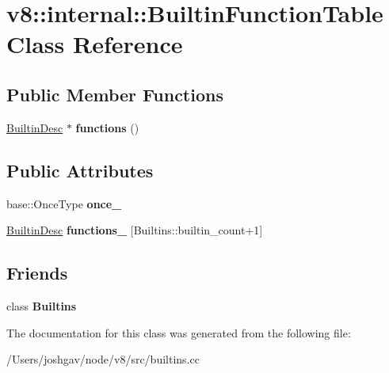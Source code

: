 \hypertarget{classv8_1_1internal_1_1_builtin_function_table}{}\section{v8\+:\+:internal\+:\+:Builtin\+Function\+Table Class Reference}
\label{classv8_1_1internal_1_1_builtin_function_table}
\subsection*{Public Member Functions}
\begin{DoxyCompactItemize}
\item 
\hyperlink{structv8_1_1internal_1_1_builtin_desc}{Builtin\+Desc} $\ast$ {\bfseries functions} ()\hypertarget{classv8_1_1internal_1_1_builtin_function_table_a10ec52c395d6924f6474b076298106b4}{}\label{classv8_1_1internal_1_1_builtin_function_table_a10ec52c395d6924f6474b076298106b4}

\end{DoxyCompactItemize}
\subsection*{Public Attributes}
\begin{DoxyCompactItemize}
\item 
base\+::\+Once\+Type {\bfseries once\+\_\+}\hypertarget{classv8_1_1internal_1_1_builtin_function_table_a1a9fe672f4e4d2e9ad88f62c63d8d461}{}\label{classv8_1_1internal_1_1_builtin_function_table_a1a9fe672f4e4d2e9ad88f62c63d8d461}

\item 
\hyperlink{structv8_1_1internal_1_1_builtin_desc}{Builtin\+Desc} {\bfseries functions\+\_\+} \mbox{[}Builtins\+::builtin\+\_\+count+1\mbox{]}\hypertarget{classv8_1_1internal_1_1_builtin_function_table_a362e4df9c4683bf2e2575590d29f7bb8}{}\label{classv8_1_1internal_1_1_builtin_function_table_a362e4df9c4683bf2e2575590d29f7bb8}

\end{DoxyCompactItemize}
\subsection*{Friends}
\begin{DoxyCompactItemize}
\item 
class {\bfseries Builtins}\hypertarget{classv8_1_1internal_1_1_builtin_function_table_afb9273054bbf7171a46b35cebb4d4b34}{}\label{classv8_1_1internal_1_1_builtin_function_table_afb9273054bbf7171a46b35cebb4d4b34}

\end{DoxyCompactItemize}


The documentation for this class was generated from the following file\+:\begin{DoxyCompactItemize}
\item 
/\+Users/joshgav/node/v8/src/builtins.\+cc\end{DoxyCompactItemize}
